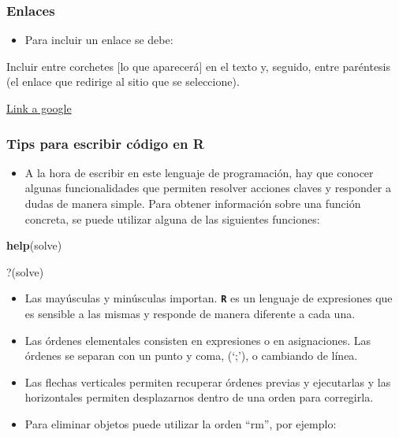\documentclass[
]{article}
\newenvironment{Shaded}{\begin{snugshade}}{\end{snugshade}}
\newcommand{\AttributeTok}[1]{\textcolor[rgb]{0.13,0.29,0.53}{#1}}
\newcommand{\FunctionTok}[1]{\textcolor[rgb]{0.13,0.29,0.53}{\textbf{#1}}}
\newcommand{\NormalTok}[1]{#1}
\newcommand{\StringTok}[1]{\textcolor[rgb]{0.31,0.60,0.02}{#1}}
\providecommand{\tightlist}{%
  \setlength{\itemsep}{0pt}\setlength{\parskip}{0pt}}
\begin{document}
\hypertarget{enlaces}{%
\subsubsection{Enlaces}\label{enlaces}}

\begin{itemize}
\tightlist
\item
  Para incluir un enlace se debe:
\end{itemize}

\begin{Shaded}
\begin{Highlighting}[]
\NormalTok{Incluir entre corchetes [lo que aparecerá] en el texto y, seguido, entre paréntesis (el enlace que redirige al sitio que se seleccione).}
\end{Highlighting}
\end{Shaded}

\href{www.google.com.ar}{Link a google}

\hypertarget{tips-para-escribir-cuxf3digo-en-r}{%
\subsubsection{Tips para escribir código en R}\label{tips-para-escribir-cuxf3digo-en-r}}

\begin{itemize}
\tightlist
\item
  A la hora de escribir en este lenguaje de programación, hay que conocer algunas funcionalidades que permiten resolver acciones claves y responder a dudas de manera simple. Para obtener información sobre una función concreta, se puede utilizar alguna de las siguientes funciones:
\end{itemize}

\begin{Shaded}
\begin{Highlighting}[]
\FunctionTok{help}\NormalTok{(solve)}
\end{Highlighting}
\end{Shaded}

\begin{Shaded}
\begin{Highlighting}[]
\StringTok{\textasciigrave{}}\AttributeTok{?}\StringTok{\textasciigrave{}}\NormalTok{(solve)}
\end{Highlighting}
\end{Shaded}

\begin{itemize}
\item
  Las mayúsculas y minúsculas importan. \textbf{\texttt{R}} es un lenguaje de expresiones que es sensible a las mismas y responde de manera diferente a cada una.
\item
  Las órdenes elementales consisten en expresiones o en asignaciones. Las órdenes se separan con un punto y coma, (`;'), o cambiando de línea.
\item
  Las flechas verticales permiten recuperar órdenes previas y ejecutarlas y las horizontales permiten desplazarnos dentro de una orden para corregirla.
\item
  Para eliminar objetos puede utilizar la orden ``rm'', por ejemplo:
\end{itemize}
\end{document}
